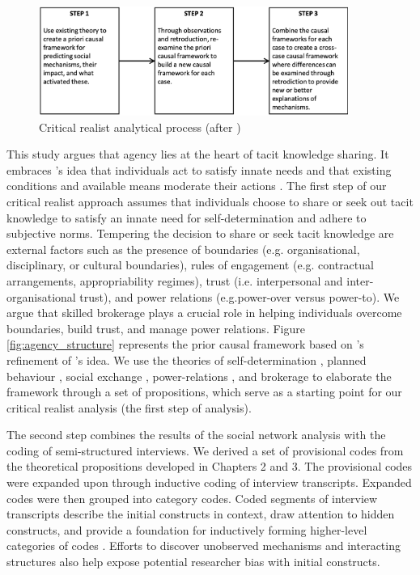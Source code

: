 \begin{figure}
\centering
\includegraphics[width = 0.9\textwidth,
height = 0.7\textheight, keepaspectratio]{Images/cr_steps.png}
\caption[Critical realist analytical process]{Critical realist analytical process (after \cite{mcavoy2018critical})}
\label{fig:cr_steps}
\end{figure}

This study argues that agency lies at the heart of tacit knowledge sharing. It embraces \citet{parsons1937structure}'s idea that individuals act to satisfy innate needs and that existing conditions and available means moderate their actions \citep{loyal2001agency}. The first step of our critical realist approach assumes that individuals choose to share or seek out tacit knowledge to satisfy an innate need for self-determination and adhere to subjective norms. Tempering the decision to share or seek tacit knowledge are external factors such as the presence of boundaries (e.g. organisational, disciplinary, or cultural boundaries), rules of engagement (e.g. contractual arrangements, appropriability regimes), trust (i.e. interpersonal and inter-organisational trust), and power relations (e.g.power-over versus power-to). We argue that skilled brokerage plays a crucial role in helping individuals overcome boundaries, build trust, and manage power relations. Figure \ref{fig:agency_structure} represents the prior causal framework based on \citet{loyal2001agency}'s refinement of \citet{parsons1937structure}'s idea. We use the theories of self-determination \citep{ryan2000self}, planned behaviour \citep{ajzen1985intentions}, social exchange \citep{blau1964exchange}, power-relations \citep{emerson1962power}, and brokerage \citep{marsden1982brokerage,burt2005brokerage,obstfeld2014brokerage} to elaborate the framework through a set of propositions, which serve as a starting point for our critical realist analysis (the first step of analysis). \medskip

The second step combines the results of the social network analysis with the coding of semi-structured interviews. We derived a set of provisional codes from the theoretical propositions developed in Chapters 2 and 3. The provisional codes were expanded upon through inductive coding of interview transcripts. Expanded codes were then grouped into category codes. Coded segments of interview transcripts describe the initial constructs in context, draw attention to hidden constructs, and provide a foundation for inductively forming higher-level categories of codes \citep{saldana2015coding}. Efforts to discover unobserved mechanisms and interacting structures also help expose potential researcher bias with initial constructs. \medskip

